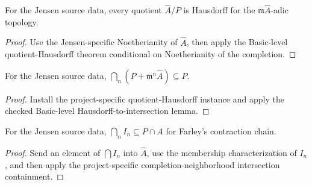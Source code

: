 \begin{lemma}
  \label{lem:bad_quotient_source_data_adic_completion_quotient_hausdorff_source}
  For the Jensen source data, every quotient \(\widehat A/P\) is Hausdorff
  for the \(\mathfrak m\widehat A\)-adic topology.
\end{lemma}

\begin{proof}
  Use the Jensen-specific Noetherianity of \(\widehat A\), then apply the
  Basic-level quotient-Hausdorff theorem conditional on Noetherianity of the
  completion.
\end{proof}

\begin{lemma}
  \label{lem:bad_quotient_source_data_adic_completion_neighborhood_iinf_le_prime_source}
  For the Jensen source data,
  \(\bigcap_n(P+\mathfrak m^n\widehat A)\subseteq P\).
\end{lemma}

\begin{proof}
  Install the project-specific quotient-Hausdorff instance and apply the
  checked Basic-level Hausdorff-to-intersection lemma.
\end{proof}

\begin{lemma}
  \label{lem:bad_quotient_source_data_bad_prime_contraction_chain_iinf_le_comap_source}
  For the Jensen source data,
  \(\bigcap_n I_n\subseteq P\cap A\) for Farley's contraction chain.
\end{lemma}

\begin{proof}
  Send an element of \(\bigcap I_n\) into \(\widehat A\), use the membership
  characterization of \(I_n\), and then apply the project-specific
  completion-neighborhood intersection containment.
\end{proof}

